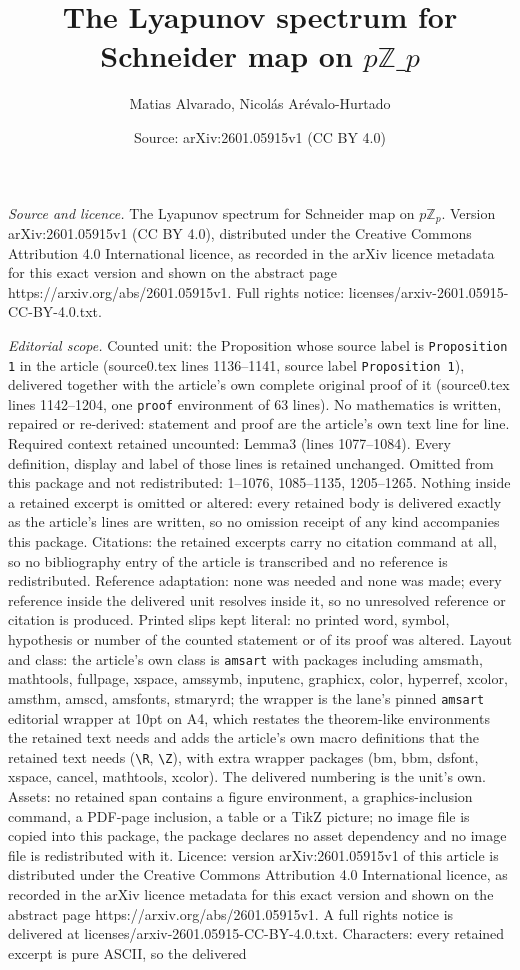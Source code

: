 \documentclass[10pt,a4paper]{amsart}
\title[The Lyapunov spectrum for Schneider map on $p\mathbb{Z}\_p$]{The Lyapunov spectrum for Schneider map on $p\mathbb{Z}\_p$}
\author{Matias Alvarado, Nicol\'as Ar\'evalo-Hurtado}
\date{Source: arXiv:2601.05915v1 (CC BY 4.0)}
\begin{document}
\maketitle

\noindent\emph{Source and licence.} The Lyapunov spectrum for Schneider map on $p\mathbb{Z}_p$. Version arXiv:2601.05915v1 (CC BY 4.0), distributed under the Creative Commons Attribution 4.0 International licence, as recorded in the arXiv licence metadata for this exact version and shown on the abstract page https://arxiv.org/abs/2601.05915v1. Full rights notice: licenses/arxiv-2601.05915-CC-BY-4.0.txt.\par\smallskip

\noindent\textit{Editorial scope.} Counted unit: the Proposition whose source label is \texttt{Proposition 1} in the article (source0.tex lines 1136--1141, source label \texttt{Proposition 1}), delivered together with the article's own complete original proof of it (source0.tex lines 1142--1204, one \texttt{proof} environment of 63 lines). No mathematics is written, repaired or re-derived: statement and proof are the article's own text line for line. Required context retained uncounted: Lemma3 (lines 1077--1084). Every definition, display and label of those lines is retained unchanged. Omitted from this package and not redistributed: 1--1076, 1085--1135, 1205--1265. Nothing inside a retained excerpt is omitted or altered: every retained body is delivered exactly as the article's lines are written, so no omission receipt of any kind accompanies this package. Citations: the retained excerpts carry no citation command at all, so no bibliography entry of the article is transcribed and no reference is redistributed. Reference adaptation: none was needed and none was made; every reference inside the delivered unit resolves inside it, so no unresolved reference or citation is produced. Printed slips kept literal: no printed word, symbol, hypothesis or number of the counted statement or of its proof was altered. Layout and class: the article's own class is \texttt{amsart} with packages including amsmath, mathtools, fullpage, xspace, amssymb, inputenc, graphicx, color, hyperref, xcolor, amsthm, amscd, amsfonts, stmaryrd; the wrapper is the lane's pinned \texttt{amsart} editorial wrapper at 10pt on A4, which restates the theorem-like environments the retained text needs and adds the article's own macro definitions that the retained text needs (\texttt{\textbackslash R}, \texttt{\textbackslash Z}), with extra wrapper packages (bm, bbm, dsfont, xspace, cancel, mathtools, xcolor). The delivered numbering is the unit's own. Assets: no retained span contains a figure environment, a graphics-inclusion command, a PDF-page inclusion, a table or a TikZ picture; no image file is copied into this package, the package declares no asset dependency and no image file is redistributed with it. Licence: version arXiv:2601.05915v1 of this article is distributed under the Creative Commons Attribution 4.0 International licence, as recorded in the arXiv licence metadata for this exact version and shown on the abstract page https://arxiv.org/abs/2601.05915v1. A full rights notice is delivered at licenses/arxiv-2601.05915-CC-BY-4.0.txt. Characters: every retained excerpt is pure ASCII, so the delivered 
\end{document}
